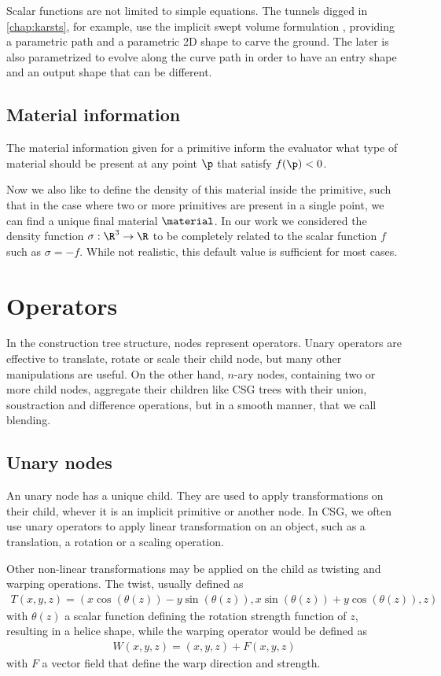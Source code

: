 Scalar functions are not limited to simple equations. The tunnels digged in \cref{chap:karsts}, for example, use the implicit swept volume formulation \cite{Schroeder1994}, providing a parametric path and a parametric 2D shape to carve the ground. The later is also parametrized to evolve along the curve path in order to have an entry shape and an output shape that can be different.

\subsection{Material information}
The material information given for a primitive inform the evaluator what type of material should be present at any point $\p$ that satisfy $f(\p) < 0$.

Now we also like to define the density of this material inside the primitive, such that in the case where two or more primitives are present in a single point, we can find a unique final material $\material$. In our work we considered the density function $\sigma: \R^3 \to \R$ to be completely related to the scalar function $f$ such as $\sigma = -f$. While not realistic, this default value is sufficient for most cases.

\section{Operators}
In the construction tree structure, nodes represent operators. Unary operators are effective to translate, rotate or scale their child node, but many other manipulations are useful. On the other hand, $n$-ary nodes, containing two or more child nodes, aggregate their children like CSG trees with their union, soustraction and difference operations, but in a smooth manner, that we call blending.

\subsection{Unary nodes}
An unary node has a unique child. They are used to apply transformations on their child, whever it is an implicit primitive or another node. In CSG, we often use unary operators to apply linear transformation on an object, such as a translation, a rotation or a scaling operation. 

Other non-linear transformations may be applied on the child as twisting and warping operations. The twist, usually defined as 
\begin{align}
    T(x, y, z) = \left( x \cos(\theta(z)) - y \sin(\theta(z)), x \sin(\theta(z)) + y \cos(\theta(z)), z \right)
\end{align}
with $\theta(z)$ a scalar function defining the rotation strength function of $z$, resulting in a helice shape, while the warping operator would be defined as 
\begin{align}
    W(x,y,z) = (x,y,z) + F(x, y, z)
\end{align}
with $F$ a vector field that define the warp direction and strength.
    

